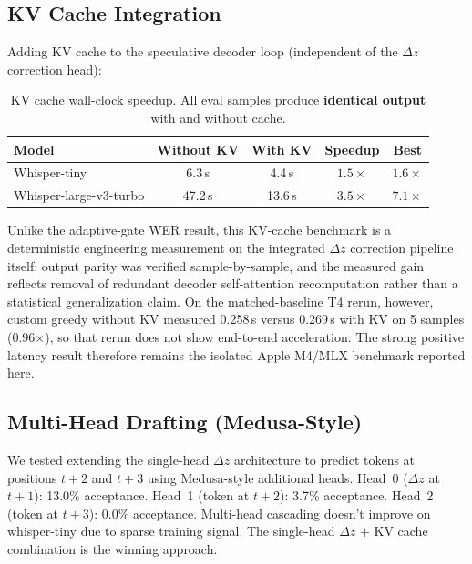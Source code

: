 \documentclass[11pt,a4paper]{article}
\begin{document}
\subsection{KV Cache Integration}
\label{sec:kvcache}

Adding KV cache to the speculative decoder loop (independent of the $\Delta z$ correction head):

\begin{table}[H]
\centering
\small
\begin{tabular}{@{}lcccc@{}}
\toprule
\textbf{Model} & \textbf{Without KV} & \textbf{With KV} & \textbf{Speedup} & \textbf{Best} \\
\midrule
Whisper-tiny & 6.3\,s & 4.4\,s & $\mathbf{1.5\times}$ & $1.6\times$ \\
Whisper-large-v3-turbo & 47.2\,s & 13.6\,s & $\mathbf{3.5\times}$ & $7.1\times$ \\
\bottomrule
\end{tabular}
\caption{KV cache wall-clock speedup.
All eval samples produce \textbf{identical output} with and without cache.}
\label{tab:kvcache}
\end{table}

Unlike the adaptive-gate WER result, this KV-cache benchmark is a deterministic engineering measurement on the integrated $\Delta z$ correction pipeline itself: output parity was verified sample-by-sample, and the measured gain reflects removal of redundant decoder self-attention recomputation rather than a statistical generalization claim. On the matched-baseline T4 rerun, however, custom greedy without KV measured 0.258\,s versus 0.269\,s with KV on 5 samples (0.96$\times$), so that rerun does not show end-to-end acceleration. The strong positive latency result therefore remains the isolated Apple M4/MLX benchmark reported here.

\subsection{Multi-Head Drafting (Medusa-Style)}

We tested extending the single-head $\Delta z$ architecture to predict tokens at positions $t+2$ and $t+3$ using Medusa-style additional heads.
Head~0 ($\Delta z$ at $t+1$): 13.0\% acceptance.
Head~1 (token at $t+2$): 3.7\% acceptance.
Head~2 (token at $t+3$): 0.0\% acceptance.
Multi-head cascading doesn't improve on whisper-tiny due to sparse training signal.
The single-head $\Delta z$ + KV cache combination is the winning approach.
\end{document}
